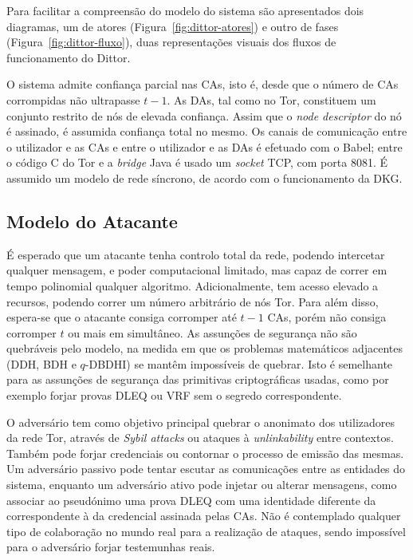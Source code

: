 Para facilitar a compreensão do modelo do sistema são apresentados dois diagramas, um de atores (Figura~\ref{fig:dittor-atores}) e outro de fases (Figura~\ref{fig:dittor-fluxo}), duas representações visuais dos fluxos de funcionamento do Dittor.

O sistema admite confiança parcial nas CAs, isto é, desde que o número de CAs corrompidas não ultrapasse $t-1$. As DAs, tal como no Tor, constituem um conjunto restrito de nós de elevada confiança. Assim que o \textit{node descriptor} do nó é assinado, é assumida confiança total no mesmo. Os canais de comunicação entre o utilizador e as CAs e entre o utilizador e as DAs é efetuado com o Babel; entre o código C do Tor e a \textit{bridge} Java é usado um \textit{socket} TCP, com porta 8081. É assumido um modelo de rede síncrono, de acordo com o funcionamento da DKG.

\subsection{Modelo do Atacante}
\label{sub:dittor_modelo_atacante}

É esperado que um atacante tenha controlo total da rede, podendo intercetar qualquer mensagem, e poder computacional limitado, mas capaz de correr em tempo polinomial qualquer algoritmo. Adicionalmente, tem acesso elevado a recursos, podendo correr um número arbitrário de nós Tor. Para além disso, espera-se que o atacante consiga corromper até $t-1$ CAs, porém não consiga corromper $t$ ou mais em simultâneo. As assunções de segurança não são quebráveis pelo modelo, na medida em que os problemas matemáticos adjacentes (DDH, BDH e $q$-DBDHI) se mantêm impossíveis de quebrar. Isto é semelhante para as assunções de segurança das primitivas criptográficas usadas, como por exemplo forjar provas DLEQ ou VRF sem o segredo correspondente.

O adversário tem como objetivo principal quebrar o anonimato dos utilizadores da rede Tor, através de \textit{Sybil attacks} ou ataques à \textit{unlinkability} entre contextos. Também pode forjar credenciais ou contornar o processo de emissão das mesmas. Um adversário passivo pode tentar escutar as comunicações entre as entidades do sistema, enquanto um adversário ativo pode injetar ou alterar mensagens, como associar ao pseudónimo uma prova DLEQ com uma identidade diferente da correspondente à da credencial assinada pelas CAs. Não é contemplado qualquer tipo de colaboração no mundo real para a realização de ataques, sendo impossível para o adversário forjar testemunhas reais.


